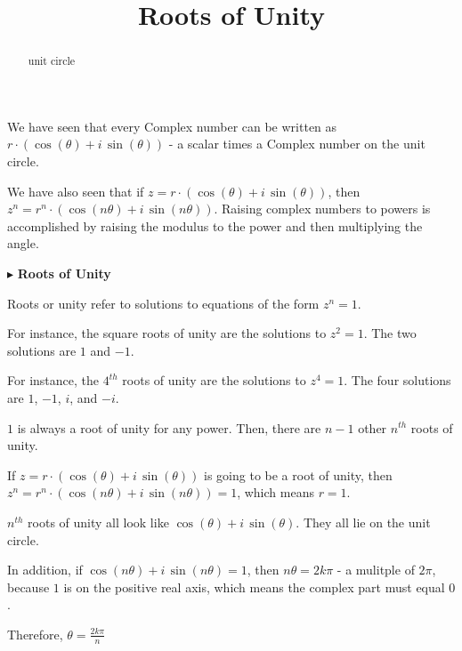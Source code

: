 \documentclass{ximera}
\title{Roots of Unity}
\begin{document}
\begin{abstract}
unit circle
\end{abstract}
\maketitle




We have seen that every Complex number can be written as $r \cdot (\cos(\theta) + i \, \sin(\theta))$ - a scalar times a Complex number on the unit circle.

We have also seen that if $z = r \cdot (\cos(\theta) + i \, \sin(\theta))$, then $z^n = r^n \cdot (\cos(n\theta) + i \, \sin(n\theta))$. Raising complex numbers to powers is accomplished by raising the modulus to the power and then multiplying the angle.


$\blacktriangleright$  \textbf{Roots of Unity}

Roots or unity refer to solutions to equations of the form $z^n = 1$.




For instance, the square roots of unity are the solutions to $z^2 = 1$.  The two solutions are $1$ and $-1$.


For instance, the $4^{th}$ roots of unity are the solutions to $z^4 = 1$.  The four solutions are $1$, $-1$, $i$, and $-i$.




$1$ is always a root of unity for any power. Then, there are $n-1$ other $n^{th}$ roots of unity.



If $z = r \cdot (\cos(\theta) + i \, \sin(\theta))$ is going to be a root of unity, then $z^n = r^n \cdot (\cos(n\theta) + i \, \sin(n\theta)) = 1$, which means $r=1$.

$n^{th}$ roots of unity all look like $\cos(\theta) + i \, \sin(\theta)$.  They all lie on the unit circle.



In addition, if $\cos(n\theta) + i \, \sin(n\theta) = 1$, then $n \theta = 2 k \pi$ - a mulitple of $2 \pi$, because $1$ is on the positive real axis, which means the complex part must equal $0$.


Therefore, $\theta = \frac{2 k \pi}{n}$  
\end{document}
